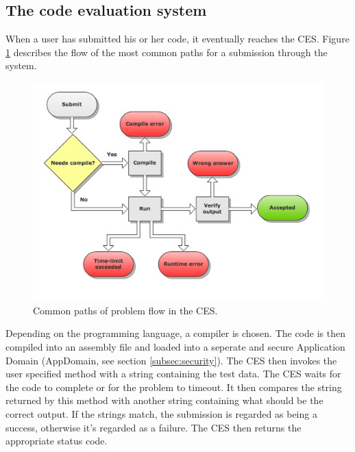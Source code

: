 \subsection{The code evaluation system}
When a user has submitted his or her code, it eventually reaches the CES. Figure \ref{fig:flowchart} describes the flow of the most common paths for a submission through the system.

\begin{figure}[h]
	\centering
	\includegraphics[width=0.8\linewidth]{chapters/media/flowchart.png}
	\caption{Common paths of problem flow in the CES.}
	\label{fig:flowchart}
\end{figure}

Depending on the programming language, a compiler is chosen. The code is then compiled into an assembly file and loaded into a seperate and secure  Application Domain (AppDomain, see section \ref{subsec:security}). The CES then invokes the user specified method with a string containing the test data. The CES waits for the code to complete or for the problem to timeout. It then compares the string returned by this method with another string containing what should be the correct output. If the strings match, the submission is regarded as being a success, otherwise it's regarded as a failure. The CES then returns the appropriate status code. 


